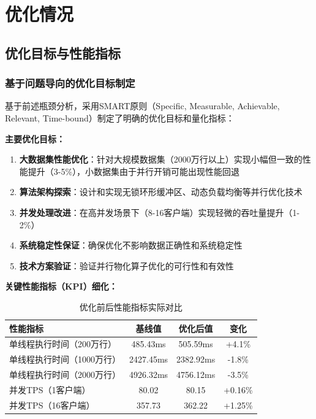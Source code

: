 \section{优化情况}

\subsection{优化目标与性能指标}

\subsubsection{基于问题导向的优化目标制定}

基于前述瓶颈分析，采用SMART原则（Specific, Measurable, Achievable, Relevant, Time-bound）制定了明确的优化目标和量化指标：

\textbf{主要优化目标：}
\begin{enumerate}[topsep = 0 pt, itemsep= 0 pt, parsep=0pt, partopsep=0pt, leftmargin=44pt, itemindent=0pt, labelsep=6pt, label=(\arabic*)]
    \item \textbf{大数据集性能优化}：针对大规模数据集（2000万行以上）实现小幅但一致的性能提升（3-5\%），小数据集由于并行开销可能出现性能回退
    \item \textbf{算法架构探索}：设计和实现无锁环形缓冲区、动态负载均衡等并行优化技术
    \item \textbf{并发处理改进}：在高并发场景下（8-16客户端）实现轻微的吞吐量提升（1-2\%）
    \item \textbf{系统稳定性保证}：确保优化不影响数据正确性和系统稳定性
    \item \textbf{技术方案验证}：验证并行物化算子优化的可行性和有效性
\end{enumerate}

\textbf{关键性能指标（KPI）细化：}

\begin{table}[htbp]
\centering
\caption{优化前后性能指标实际对比}
\begin{tabular}{|l|c|c|c|}
\hline
\textbf{性能指标} & \textbf{基线值} & \textbf{优化后值} & \textbf{变化} \\
\hline
单线程执行时间（200万行） & 485.43ms & 505.59ms & +4.1\% \\
单线程执行时间（1000万行） & 2427.45ms & 2382.92ms & -1.8\% \\
单线程执行时间（2000万行） & 4926.32ms & 4756.12ms & -3.5\% \\
并发TPS（1客户端） & 80.02 & 80.15 & +0.16\% \\
并发TPS（16客户端） & 357.73 & 362.22 & +1.25\% \\
\hline
\end{tabular}
\end{table}

